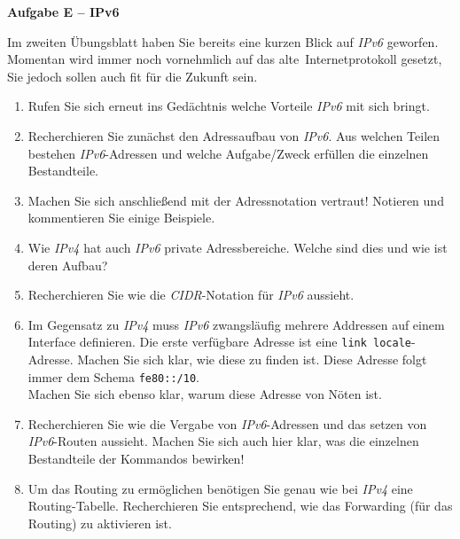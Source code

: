 \documentclass[paper=a4,fontsize=11pt]{scrartcl}%
\numberwithin{equation}{section}
\begin{document}
\begin{center}\Large{\textbf{Aufgabe E -- IPv6}}\end{center}\vskip0.25in
Im zweiten Übungsblatt haben Sie bereits eine kurzen Blick auf \emph{IPv6} geworfen. Momentan wird immer noch vornehmlich auf das \glqq alte\grqq\ Internetprotokoll gesetzt, Sie jedoch sollen auch fit für die Zukunft sein.
\begin{enumerate}
	\item Rufen Sie sich erneut ins Gedächtnis welche Vorteile \emph{IPv6} mit sich bringt.
	\item Recherchieren Sie zunächst den Adressaufbau von \emph{IPv6}. Aus welchen Teilen bestehen \emph{IPv6}-Adressen und welche Aufgabe/Zweck erfüllen die einzelnen Bestandteile.
	\item Machen Sie sich anschließend mit der Adressnotation vertraut! Notieren und kommentieren Sie einige Beispiele.
	\item Wie \emph{IPv4} hat auch \emph{IPv6} private Adressbereiche. Welche sind dies und wie ist deren Aufbau?
	\item Recherchieren Sie wie die \emph{CIDR}-Notation für \emph{IPv6} aussieht.
	\item Im Gegensatz zu \emph{IPv4} muss \emph{IPv6} zwangsläufig mehrere Addressen auf einem Interface definieren. Die erste verfügbare Adresse ist eine \texttt{link locale}-Adresse. Machen Sie sich klar, wie diese zu finden ist. Diese Adresse folgt immer dem Schema  \texttt{fe80::/10}.\\
	Machen Sie sich ebenso klar, warum diese Adresse von Nöten ist.
	\item Recherchieren Sie wie die Vergabe von \emph{IPv6}-Adressen und das setzen von \emph{IPv6}-Routen aussieht. Machen Sie sich auch hier klar, was die einzelnen Bestandteile der Kommandos bewirken!
	\item Um das Routing zu ermöglichen benötigen Sie genau wie bei \emph{IPv4} eine Routing-Tabelle. Recherchieren Sie entsprechend, wie das Forwarding (für das Routing) zu aktivieren ist.
\end{enumerate}
\end{document}
